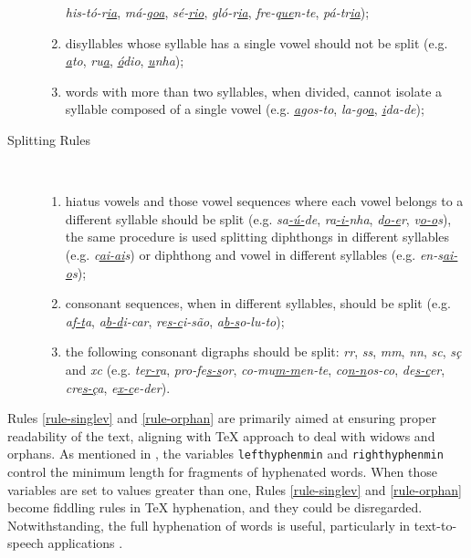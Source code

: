 \begin{description}
\begin{enumerate}
  \emph{his-tó-r\underline{ia}}, \emph{má-g\underline{oa}}, 
  \emph{sé-\underline{rio}}, \emph{gló-r\underline{ia}}, \emph{fre-q\underline{ue}n-te},
  \emph{pá-tr\underline{ia}});
    \item\label{rule-singlev} disyllables whose syllable has a single vowel should 
	not be split (e.g. \emph{\underline{a}to}, \emph{ru\underline{a}}, 
	\emph{\underline{ó}dio}, \emph{\underline{u}nha});
    \item\label{rule-orphan} words with more than two syllables, when divided, cannot 
	isolate a syllable composed of a single vowel (e.g. \emph{\underline{a}gos-to}, 
	\emph{la-go\underline{a}}, \emph{\underline{i}da-de});
\end{enumerate}

\item[Splitting Rules]\ 

\begin{enumerate}[resume]
    \item\label{rule-hiatus} hiatus vowels and those vowel sequences where each vowel
	belongs to a different syllable should be split (e.g.
	\emph{sa\underline{-ú-}de}, \emph{ra\underline{-i-}nha}, \emph{d\underline{o-e}r},
	\emph{v\underline{o-o}s}), the same procedure is used splitting diphthongs
	in different syllables (e.g. \emph{c\underline{ai-ai}s}) or diphthong and
	vowel in different syllables (e.g. \emph{en-s\underline{ai-o}s});
    \item\label{rule-consonants} consonant sequences, when in different syllables, should
	be split (e.g. \emph{a\underline{f-t}a}, \emph{a\underline{b-d}i-car},
	\emph{re\underline{s-c}i-são}, \emph{a\underline{b-s}o-lu-to});
    \item\label{rule-digraphs} the following consonant digraphs should be split:
	\emph{rr}, \emph{ss}, \emph{mm}, \emph{nn}, \emph{sc}, \emph{sç} and
	\emph{xc} (e.g. \emph{te\underline{r-r}a}, \emph{pro-fe\underline{s-s}or},
	\emph{co-mu\underline{\emph{m-m}}en-te}, \emph{co\underline{n-n}os-co},
	\emph{de\underline{s-c}er}, \emph{cre\underline{s-ç}a}, \emph{e\underline{x-c}e-der}).
\end{enumerate}
\end{description}

Rules \ref{rule-singlev} and \ref{rule-orphan} are primarily aimed at ensuring
proper readability of the text, aligning with \TeX{} approach to deal with
widows and orphans. As mentioned in , the variables
\verb|lefthyphenmin| and \verb|righthyphenmin| control the minimum length for
fragments of hyphenated words.  When those variables are set to values greater
than one, Rules \ref{rule-singlev} and \ref{rule-orphan} become fiddling rules
in \TeX{} hyphenation, and they could be disregarded. Notwithstanding, the full
hyphenation of words is useful, particularly in text-to-speech applications
\parencite{libossek2000,trogkanis2010}.

